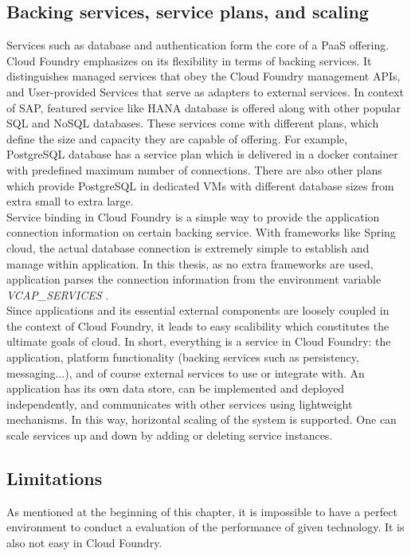 \subsection{ Backing services, service plans, and scaling}
Services such as database and authentication form the core of a \ac{PaaS} offering. Cloud Foundry emphasizes on its flexibility in terms of backing services. It distinguishes managed services that obey the Cloud Foundry management APIs, and User-provided Services that serve as adapters to external services. In context of SAP, featured service like HANA database is offered along with other popular SQL and NoSQL databases. These services come with different plans, which define the size and capacity they are capable of offering. For example, PostgreSQL database has a service plan which is delivered in a docker container with predefined maximum number of connections. There are also other plans which provide PostgreSQL in dedicated VMs with different database sizes from extra small to extra large. \\
Service binding in Cloud Foundry is a simple way to provide the application connection information on certain backing service. With frameworks like Spring cloud, the actual database connection is extremely simple to establish and manage within application. In this thesis, as no extra frameworks are used, application parses the connection information from the environment variable \textit{VCAP\_SERVICES} . \\
Since applications and its essential external components are loosely coupled in the context of Cloud Foundry, it leads to easy scalibility which constitutes the ultimate goals of cloud.  In short, everything is a service in Cloud Foundry: the application, platform functionality (backing services such as persistency, messaging...), and of course external services to use or integrate with. An application has its own data store, can be implemented and deployed independently, and communicates with other services using lightweight mechanisms.  In this way, horizontal scaling of the system is supported. One can scale services up and down by adding or deleting service instances.

\subsection{Limitations}
As mentioned at the beginning of this chapter, it is impossible to have a perfect environment to conduct a evaluation of the performance of given technology. It is also not easy in Cloud Foundry. \\
